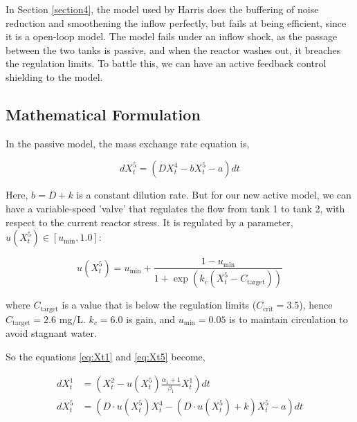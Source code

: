 \documentclass[conference]{IEEEtran}
\renewcommand{\smallskip}{\vspace{0.5\baselineskip}}
\theoremstyle{definitionsc}
\theoremstyle{plainsc}
\theoremstyle{remarksc}
\begin{document}
In Section \ref{section4}, the model used by Harris does the buffering of noise reduction and smoothening the inflow perfectly, but fails at being efficient, since it is a open-loop model. The model fails under an inflow shock, as the passage between the two tanks is passive, and when the reactor washes out, it breaches the regulation limits. To battle this, we can have an active feedback control shielding to the model.






\smallskip

\subsection{\textbf{Mathematical Formulation}}
	
In the passive model, the mass exchange rate equation is,

\begin{equation*}
	dX_t^5 = \left(D X_t^4 - b X_t^5 - a\right) dt
\end{equation*}

Here, $b = D + k$ is a constant dilution rate. But for our new active model, we can have a variable-speed 'valve' that regulates the flow from tank 1 to tank 2, with respect to the current reactor stress. It is regulated by a parameter, $u(X_t^5) \in [u_{\min}, 1.0]$:

\begin{equation}
	u(X_t^5) = u_{\min} + \frac{1 - u_{\min}}{1 + \exp\left(k_c (X_t^5 - C_{\text{target}})\right)}
\end{equation}

\smallskip


where $C_\text{target}$ is a value that is below the regulation limits ($C_\text{crit}=3.5$), hence $C_\text{target}=2.6$ mg/L. $k_c = 6.0$ is gain, and $u_{\text{min}} = 0.05$ is to maintain circulation to avoid stagnant water.

\smallskip

So the equations \ref{eq:Xt1} and \ref{eq:Xt5} become,

\begin{align}
	dX_t^1 &= \left(X_t^2 - u(X_t^5)\frac{\alpha_1 + 1}{\beta_1} X_t^1\right) dt \\
	dX_t^5 &= \left(D \cdot u(X_t^5) X_t^4 - (D \cdot u(X_t^5) + k) X_t^5 - a\right) dt
\end{align}



\smallskip
\end{document}
